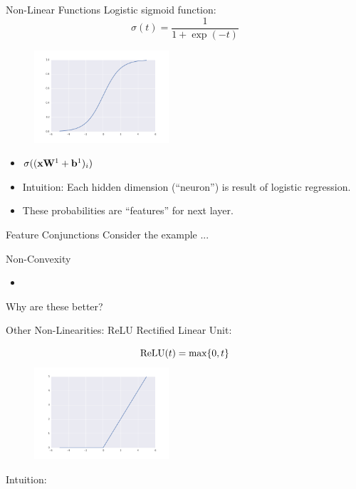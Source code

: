 \documentclass{beamer}
\begin{document}
\begin{frame}{Non-Linear Functions}
  Logistic sigmoid function:
  \[\sigma(t) = \frac{1}{1 + \exp(-t)} \]
  \begin{figure}
    \centering
    \includegraphics[width=5cm]{../notebooks/sigmoid}
  \end{figure}

  \begin{itemize}
  \item $\sigma((\mathbf{x}\mathbf{W}^1 + \mathbf{b}^1)_i)$
  \item Intuition: Each hidden dimension (``neuron'') is result of logistic regression.
  \item These probabilities are ``features'' for next layer. 
  \end{itemize}
\end{frame}

\begin{frame}{Feature Conjunctions}
  Consider the example ... 
\end{frame}


\begin{frame}{Non-Convexity}

  \begin{itemize}
  \item 
  \end{itemize}
\end{frame}


\begin{frame}
  Why are these better?
\end{frame}


\begin{frame}{Other Non-Linearities: ReLU}
  Rectified Linear Unit:
  \begin{figure}
    \centering
    \[\relu(t) = \max\{0, t\} \]
    \includegraphics[width=5cm]{../notebooks/Relu}
  \end{figure}
  Intuition:
\end{frame}
\end{document}
